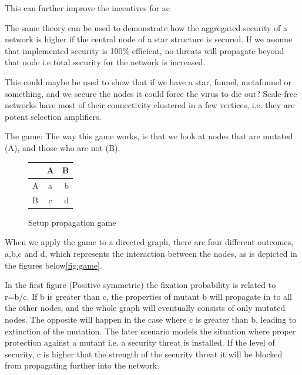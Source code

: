     
 
This can further improve the incentives for ac

The same theory can be used to demonstrate how the aggregated security of a network is higher if the central node of a star structure is secured. 
If we assume that implemented security is 100$\%$ efficient, no threats will propagate beyond that node i.e total security for the network is increased. 
 
This could maybe be used to show that if we have a star, funnel, metafunnel or something, and we secure the nodes it could force the virus to die out?
Scale-free networks have most of their connectivity clustered in a few vertices, i.e. they are potent selection amplifiers.

 
The game:
The way this game works, is that we look at nodes that are mutated (A), and those who are not (B).  
\begin{figure}
\centering 
\begin{tabular}{ l | c | r }
  
   & A & B \\  \hline  
  A & a & b \\ \hline  
  B & c & d \\
  
\end{tabular}
\caption{\label{fig:gamesetup} Setup propagation game \cite{lieberman2005evolutionary}}
\end{figure}

When we apply the game to a directed graph, there are four different outcomes, a,b,c and d, which represents the interaction between the nodes, as is depicted in the figures below\ref{fig:game}. 

In the first figure (Positive symmetric) the fixation probability is related to r=b/c. If b is greater than c, the properties of mutant b will propagate in to all the other nodes, and the whole graph will eventually consists of only mutated nodes. The opposite will happen in the case where c is greater than b, leading to extinction of the mutation. The later scenario models the situation where proper protection against a mutant i.e. a security threat is installed. If the level of security, c is higher that the strength of the security threat it will be blocked from propagating further into the network. 

